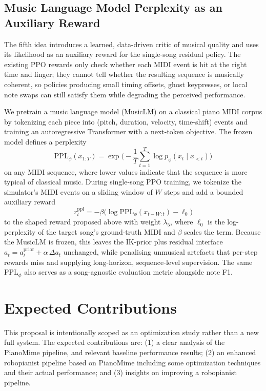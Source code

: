 \documentclass{article}
\newcommand{\residual}{\Delta a}
\begin{document}
\subsection{Music Language Model Perplexity as an Auxiliary Reward}

The fifth idea introduces a learned, data-driven critic of musical quality and uses its likelihood as an auxiliary reward for the single-song residual policy. The existing PPO rewards only check whether each MIDI event is hit at the right time and finger; they cannot tell whether the resulting sequence is musically coherent, so policies producing small timing offsets, ghost keypresses, or local note swaps can still satisfy them while degrading the perceived performance.

We pretrain a music language model (MusicLM) on a classical piano MIDI corpus by tokenizing each piece into (pitch, duration, velocity, time-shift) events and training an autoregressive Transformer with a next-token objective. The frozen model defines a perplexity
\begin{equation}
    \mathrm{PPL}_\phi(x_{1:T}) = \exp\!\bigg(-\frac{1}{T}\sum_{t=1}^{T}\log p_\phi(x_t \mid x_{<t})\bigg)
\end{equation}
on any MIDI sequence, where lower values indicate that the sequence is more typical of classical music. During single-song PPO training, we tokenize the simulator's MIDI events on a sliding window of $W$ steps and add a bounded auxiliary reward
\begin{equation}
    r^{\mathrm{ppl}}_t = -\beta\bigl(\log \mathrm{PPL}_\phi(x_{t-W:t}) - \ell_0\bigr)
\end{equation}
to the shaped reward proposed above with weight $\lambda_5$, where $\ell_0$ is the log-perplexity of the target song's ground-truth MIDI and $\beta$ scales the term. Because the MusicLM is frozen, this leaves the IK-prior plus residual interface $a_t = a^{\mathrm{prior}}_t + \alpha\,\residual_t$ unchanged, while penalising unmusical artefacts that per-step rewards miss and supplying long-horizon, sequence-level supervision. The same $\mathrm{PPL}_\phi$ also serves as a song-agnostic evaluation metric alongside note F1.

\section{Expected Contributions}

This proposal is intentionally scoped as an optimization study rather than a new full system. The expected contributions are: (1) a clear analysis of the PianoMime pipeline, and relevant baseline performance results; (2) an enhanced robopianist pipeline based on PianoMime including some optimization techniques and their actual performance; and (3) insights on improving a robopianist pipeline.



\end{document}
